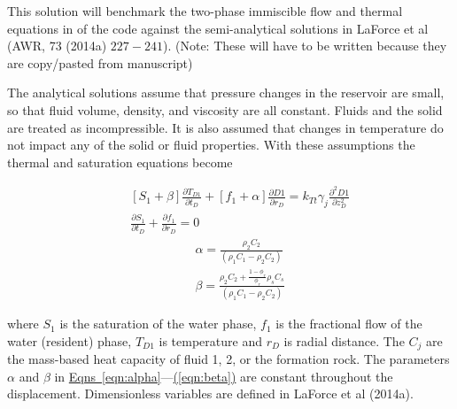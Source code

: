 \documentclass[12pt]{report}
\begin{document}
This solution will benchmark the two-phase immiscible flow and thermal equations in of the code against the semi-analytical solutions in LaForce et al (AWR, 73 (2014a) $227 - 241$). (Note: These will have to be written because they are copy/pasted from manuscript)

The analytical solutions assume that pressure changes in the reservoir are small, so that fluid volume, density, and viscosity are all constant. Fluids and the solid are treated as incompressible.  It is also assumed that changes in temperature do not impact any of the solid or fluid properties.  With these assumptions the thermal and saturation equations become

\begin{eqnarray}
&&\left[ S_1  + \beta \right]\frac{\partial T_{D1}}{\partial t_D} +
\left[  f_1  + \alpha\right] \frac{\partial {D1}}{\partial r_D} = k_{Tt}\gamma_j \frac{\partial^2 {D1}}{\partial z_D^2} \label{eqn:generic_T}\\
&&\frac{\partial S_1}{\partial t_D } + \frac{\partial f_1}{\partial r_D } = 0 \label{eqn:generic_S}
\end{eqnarray}
\begin{eqnarray}
&&\alpha = \frac{\rho_2  C_2}{\left(\rho_1  C_1  - \rho_2  C_2 \right)} \label{eqn:alpha}\\
&&\beta = \frac{\rho_2  C_2  + \frac{ 1-\phi_r }{\phi_r}\rho_s C_s }{\left(\rho_1  C_1  - \rho_2  C_2 \right)} \label{eqn:beta}
\end{eqnarray}

\noindent where $S_1$ is the saturation of the water phase, $f_1$ is
the fractional flow of the water (resident) phase, $T_{D1}$ is
temperature and $r_D$ is radial distance.  The $C_j$ are the
mass-based heat capacity of fluid 1, 2, or the formation rock.  The
parameters $\alpha$ and $\beta$ in
\hyperref[eqn:alpha]{Eqns~\ref*{eqn:alpha}}---\hyperref[eqn:beta]{(\ref*{eqn:beta})}
are constant throughout the displacement.  Dimensionless variables are
defined in LaForce et al (2014a).

%
%
\end{document}

